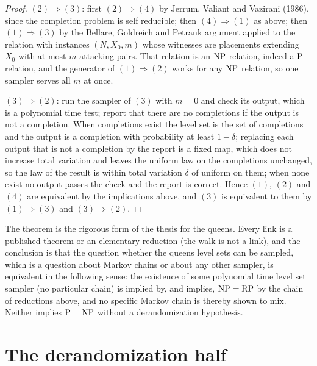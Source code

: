 \begin{proof}
$(2) \Rightarrow (3)$: first $(2) \Rightarrow (4)$ by Jerrum, Valiant and Vazirani \cite{JVV} (1986), since the completion problem is self reducible; then $(4) \Rightarrow (1)$ as above; then $(1) \Rightarrow (3)$ by the Bellare, Goldreich and Petrank argument applied to the relation with instances $(N, X_0, m)$ whose witnesses are placements extending $X_0$ with at most $m$ attacking pairs. That relation is an $\mathrm{NP}$ relation, indeed a $\mathrm{P}$ relation, and the generator of $(1) \Rightarrow (2)$ works for any $\mathrm{NP}$ relation, so one sampler serves all $m$ at once.

$(3) \Rightarrow (2)$: run the sampler of $(3)$ with $m = 0$ and check its output, which is a polynomial time test; report that there are no completions if the output is not a completion. When completions exist the level set is the set of completions and the output is a completion with probability at least $1 - \delta$; replacing each output that is not a completion by the report is a fixed map, which does not increase total variation and leaves the uniform law on the completions unchanged, so the law of the result is within total variation $\delta$ of uniform on them; when none exist no output passes the check and the report is correct. Hence $(1)$, $(2)$ and $(4)$ are equivalent by the implications above, and $(3)$ is equivalent to them by $(1) \Rightarrow (3)$ and $(3) \Rightarrow (2)$.
\end{proof}

The theorem is the rigorous form of the thesis for the queens. Every link is a published theorem or an elementary reduction (the walk is not a link), and the conclusion is that the question whether the queens level sets can be sampled, which is a question about Markov chains or about any other sampler, is equivalent in the following sense: the existence of some polynomial time level set sampler (no particular chain) is implied by, and implies, $\mathrm{NP} = \mathrm{RP}$ by the chain of reductions above, and no specific Markov chain is thereby shown to mix. Neither implies $\mathrm{P} = \mathrm{NP}$ without a derandomization hypothesis.

\section{The derandomization half}

